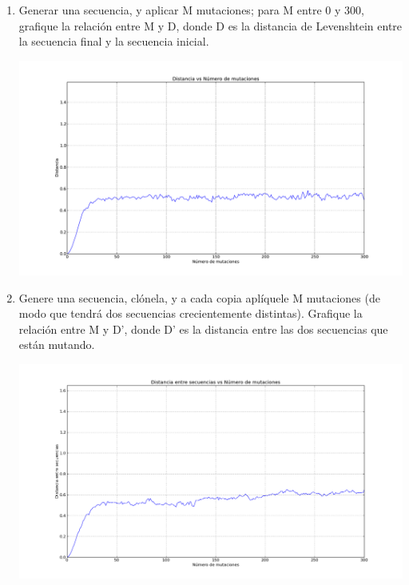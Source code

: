 \begin{enumerate}

	\item Generar una secuencia, y aplicar M mutaciones; para M entre 0 y 300, grafique la relación
		entre M y D, donde D es la distancia de Levenshtein entre la secuencia final y la secuencia
		inicial.


		\begin{center}
			\includegraphics[width=\textwidth]{scripts/pregunta-2-1-new.pdf}
		\end{center}


	\item Genere una secuencia, clónela, y a cada copia aplíquele M mutaciones (de modo que tendrá
		dos secuencias crecientemente distintas). Grafique la relación entre M y D’, donde D’ es la
		distancia entre las dos secuencias que están mutando.


		\begin{center}
			\includegraphics[width=\textwidth]{scripts/pregunta-2-2-new.pdf}
		\end{center}



\end{enumerate}
